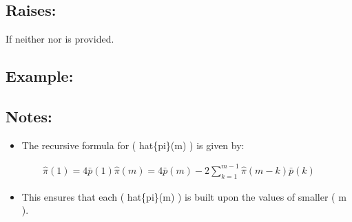 \documentclass[a4paper,11pt,openany,english]{sphinxmanual}
\begin{document}
\begin{fulllineitems}
\begin{description}
\end{description}


\subsection{Raises:}
\label{\detokenize{api_biascorrection:raises}}\begin{description}
\sphinxAtStartPar
If neither  nor  is provided.

\end{description}


\subsection{Example:}
\label{\detokenize{api_biascorrection:id10}}
\begin{sphinxVerbatim}[commandchars=\\\{\}]
   
  \PYG{p}{[}         \PYG{p}{]}
  \PYG{p}{[}  \PYG{p}{]}
   
\end{sphinxVerbatim}


\subsection{Notes:}
\label{\detokenize{api_biascorrection:id11}}\begin{itemize}
\item {} 
\sphinxAtStartPar
The recursive formula for ( hat\{pi\}(m) ) is given by:

\end{itemize}
\begin{equation*}
\begin{split}\hat{\pi}(1) = 4 \bar{p}(1)
\hat{\pi}(m) = 4 \bar{p}(m) - 2 \sum_{k=1}^{m-1} \hat{\pi}(m-k) \bar{p}(k)\end{split}
\end{equation*}\begin{itemize}
\item {} 
\sphinxAtStartPar
This ensures that each ( hat\{pi\}(m) ) is built upon the values of smaller ( m ).


\end{itemize}
\end{fulllineitems}
\end{document}
